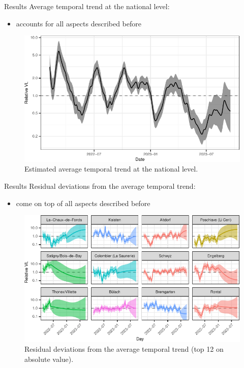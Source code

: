 \documentclass[
  ignorenonframetext,
]{beamer}
\providecommand{\tightlist}{%
  \setlength{\itemsep}{0pt}\setlength{\parskip}{0pt}}
\begin{document}
\begin{frame}{Results}
\protect\hypertarget{results-6}{}
Average temporal trend at the \alert{national} level:

\begin{itemize}
\tightlist
\item
  accounts for all aspects described before
\end{itemize}

\begin{figure}
\includegraphics[width=0.8\linewidth]{2023-11-07_pres_files/figure-beamer/res5-1} \caption{Estimated average temporal trend at the national level.}\label{fig:res5}
\end{figure}
\end{frame}

\begin{frame}{Results}
\protect\hypertarget{results-7}{}
\alert{Residual deviations} from the average temporal trend:

\begin{itemize}
\tightlist
\item
  come on top of all aspects described before
\end{itemize}

\begin{figure}
\includegraphics[width=0.8\linewidth]{2023-11-07_pres_files/figure-beamer/res7-1} \caption{Residual deviations from the average temporal trend (top 12 on absolute value).}\label{fig:res7}
\end{figure}
\end{frame}
\end{document}
